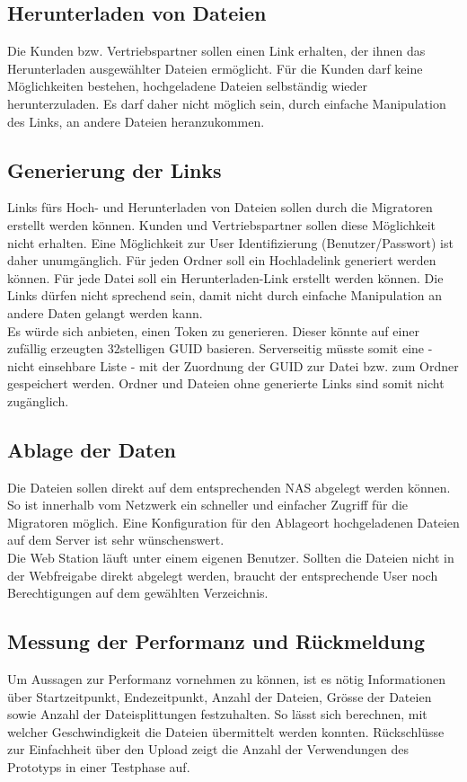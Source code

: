\subsection{Herunterladen von Dateien}
Die Kunden bzw. Vertriebspartner sollen einen Link erhalten, der ihnen das Herunterladen ausgewählter Dateien ermöglicht.
Für die Kunden darf keine Möglichkeiten bestehen, hochgeladene Dateien selbständig wieder herunterzuladen. 
Es darf daher nicht möglich sein, durch einfache Manipulation des Links, an andere Dateien heranzukommen.

\subsection{Generierung der Links}\label{subsec:Links}
Links fürs Hoch-  und Herunterladen von Dateien sollen durch die Migratoren erstellt werden können. Kunden und Vertriebspartner sollen diese Möglichkeit nicht erhalten. 
Eine Möglichkeit zur User Identifizierung (Benutzer/Passwort) ist daher unumgänglich.
Für jeden Ordner soll ein Hochladelink generiert werden können. Für jede Datei soll ein Herunterladen-Link erstellt werden können. 
Die Links dürfen nicht sprechend sein, damit nicht durch einfache Manipulation an andere Daten gelangt werden kann. 
\\ 
Es würde sich anbieten, einen Token zu generieren. Dieser könnte auf einer zufällig erzeugten 32stelligen GUID basieren.
Serverseitig müsste somit eine - nicht einsehbare Liste - mit der Zuordnung der GUID zur Datei bzw. zum Ordner gespeichert werden.
Ordner und Dateien ohne generierte Links sind somit nicht zugänglich.

\subsection{Ablage der Daten}
Die Dateien sollen direkt auf dem entsprechenden NAS abgelegt werden können. So ist innerhalb vom Netzwerk ein schneller und einfacher Zugriff für die Migratoren möglich.
Eine Konfiguration für den Ablageort hochgeladenen Dateien auf dem Server ist sehr wünschenswert.
\\
Die Web Station läuft unter einem eigenen Benutzer. 
Sollten die Dateien nicht in der Webfreigabe direkt abgelegt werden, braucht der entsprechende User noch Berechtigungen auf dem gewählten Verzeichnis.

\clearpage
\subsection{Messung der Performanz und Rückmeldung}
Um Aussagen zur Performanz vornehmen zu können, ist es nötig Informationen über Startzeitpunkt, Endezeitpunkt, Anzahl der Dateien, Grösse der Dateien sowie Anzahl der Dateisplittungen festzuhalten.
So lässt sich berechnen, mit welcher Geschwindigkeit die Dateien übermittelt werden konnten.
Rückschlüsse zur Einfachheit über den Upload zeigt die Anzahl der Verwendungen des Prototyps in einer Testphase auf.


